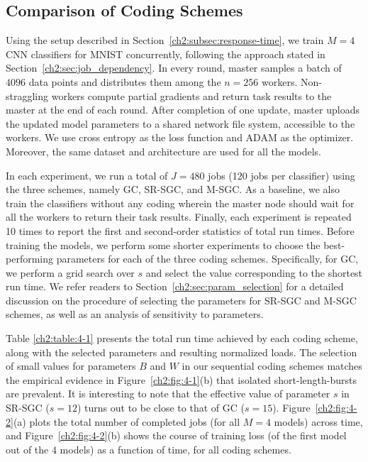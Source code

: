 \FloatBarrier

\subsection{Comparison of Coding Schemes} \label{ch2:subsec:comp}
Using the setup described in Section~\ref{ch2:subsec:response-time}, we train $M=4$ CNN classifiers for MNIST concurrently, following the approach stated in Section~\ref{ch2:sec:job_dependency}. In every round, master samples a batch of $4096$ data points and distributes them among the $n=256$ workers. Non-straggling workers compute partial gradients and return task results to the master at the end of each round. After completion of one update, master uploads the updated model parameters to a shared network file system, accessible to the workers.  We use cross entropy as the loss function and ADAM \cite{kingma2014adam} as the optimizer. Moreover, the same dataset and architecture are used for all the models.

In each experiment, we run a total of $J=480$ jobs (120 jobs per classifier) using the three schemes, namely GC, SR-SGC, and M-SGC. As a baseline, we also train the classifiers without any coding wherein the master node should wait for all the workers to return their task results. Finally, each experiment is repeated 10 times to report the first and second-order statistics of total run times. Before training the models, we perform some shorter experiments to choose the best-performing parameters for each of the three coding schemes. Specifically, for GC, we perform a grid search over $s$ and select the value corresponding to the shortest run time.
{We refer readers to Section~\ref{ch2:sec:param_selection} for a detailed discussion on the procedure of selecting the parameters for SR-SGC and M-SGC schemes, as well as an analysis of sensitivity to parameters.}

Table \ref{ch2:table:4-1} presents the total run time achieved by each coding scheme, along with the selected parameters and resulting normalized loads.
The selection of small values for parameters $B$ and $W$ in our sequential coding schemes matches the empirical evidence in Figure~\ref{ch2:fig:4-1}(b) that isolated short-length-bursts are prevalent. It is interesting to note that the effective value of parameter $s$ in SR-SGC ($s=12$) turns out to be close to that of GC ($s=15$).  Figure~\ref{ch2:fig:4-2}(a) plots the total number of completed jobs (for all $M=4$ models) across time, and Figure~\ref{ch2:fig:4-2}(b) shows the course of training loss (of the first model out of the $4$ models) as a function of time, for all coding schemes. 


